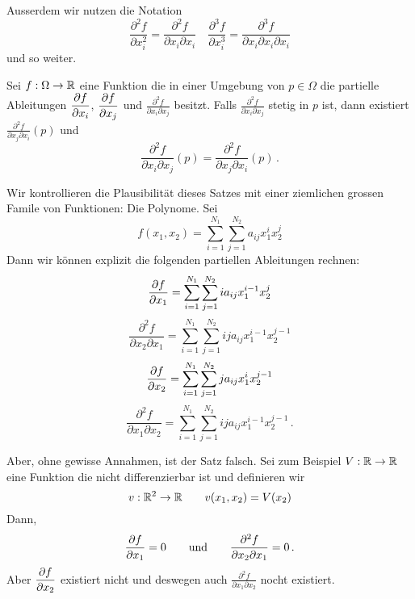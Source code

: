 Ausserdem wir nutzen die Notation
\[\frac{\partial^2 f}{\partial x_i^2} = \frac{\partial^2 f}{\partial x_i \partial x_i}\quad
\frac{\partial^3 f}{\partial x_i^3}= \frac{\partial^3 f}{\partial x_i \partial x_i \partial x_i}\]
und so weiter. 
\begin{Sat}
Sei $f:\Omega\rightarrow\mathbb{R}$ eine Funktion die in einer Umgebung von $p\in\Omega$ die partielle Ableitungen $\dfrac{\partial f}{\partial x_i}$, $\dfrac{\partial f}{\partial x_j}$ und $\frac{\partial^2 f}{\partial x_i \partial x_j}$ besitzt. Falls $\frac{\partial^2 f}{\partial x_i \partial x_j}$ stetig in $p$ ist, dann existiert $\frac{\partial^2 f}{\partial x_j\partial x_i}(p)$ und
  \[\frac{\partial^2 f}{\partial x_i\partial x_j}(p)=\frac{\partial^2 f}{\partial x_j\partial x_i}(p)\, .\]
\end{Sat}
\begin{Bsp} Wir kontrollieren die Plausibilit\"at dieses Satzes mit einer ziemlichen grossen Famile
von Funktionen: Die Polynome. Sei
  \[f(x_1,x_2)=\sum_{i=1}^{N_1}\sum_{j=1}^{N_2}a_{ij}x_1^ix_2^j\]
Dann wir k\"onnen explizit die folgenden partiellen Ableitungen rechnen:
  \[\dfrac{\partial f}{\partial x_1}=\sum_{i=1}^{N_1}\sum_{j=1}^{N_2}ia_{ij}x_1^{i-1}x_2^j\]
  \[\frac{\partial^2 f}{\partial x_2\partial x_1}=\sum_{i=1}^{N_1}\sum_{j=1}^{N_2}ija_{ij}x_1^{i-1}x_2^{j-1}\]
  \[\dfrac{\partial f}{\partial x_2}=\sum_{i=1}^{N_1}\sum_{j=1}^{N_2}ja_{ij}x_1^ix_2^{j-1}\]
  \[\frac{\partial^2 f}{\partial x_1\partial x_2}=\sum_{i=1}^{N_1}\sum_{j=1}^{N_2}ija_{ij}x_1^{i-1}x_2^{j-1}\, .\]
\end{Bsp}
\begin{Bsp} Aber, ohne gewisse Annahmen, ist der Satz falsch. 
  Sei zum Beispiel $V:\mathbb{R}\rightarrow\mathbb{R}$ eine Funktion die nicht differenzierbar ist und definieren wir
  \[v:\mathbb{R}^2\rightarrow\mathbb{R} \qquad v(x_1,x_2)=V(x_2)\]
Dann,
  \[\dfrac{\partial f}{\partial x_1}=0 \qquad\mbox{und}\qquad \frac{\partial^2f}{\partial x_2\partial x_1}=0\, .\]
Aber $\dfrac{\partial f}{\partial x_2}$ existiert nicht und deswegen auch $\frac{\partial^2 f}{\partial x_1 \partial x_2}$
nocht existiert.
\end{Bsp}
